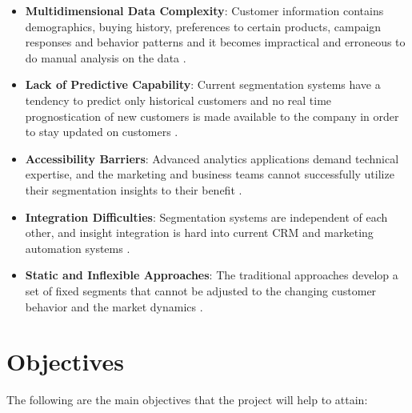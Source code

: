 \documentclass[12pt,a4paper]{report}
\begin{document}
\begin{itemize}
    \item \textbf{Multidimensional Data Complexity}: Customer information contains demographics, buying history, preferences to certain products, campaign responses and behavior patterns and it becomes impractical and erroneous to do manual analysis on the data \cite{verhoef2010, larose2014}.
    
    \item \textbf{Lack of Predictive Capability}: Current segmentation systems have a tendency to predict only historical customers and no real time prognostication of new customers is made available to the company in order to stay updated on customers \cite{neslin2006, shmueli2010}.
    
    \item \textbf{Accessibility Barriers}: Advanced analytics applications demand technical expertise, and the marketing and business teams cannot successfully utilize their segmentation insights to their benefit \cite{streamlit2019, davenport2013}.
    
    \item \textbf{Integration Difficulties}: Segmentation systems are independent of each other, and insight integration is hard into current CRM and marketing automation systems \cite{payne2005}.
    
    \item \textbf{Static and Inflexible Approaches}: The traditional approaches develop a set of fixed segments that cannot be adjusted to the changing customer behavior and the market dynamics \cite{wedel2000market, bose2009}.
\end{itemize}

\section{Objectives}
The following are the main objectives that the project will help to attain:
\end{document}
